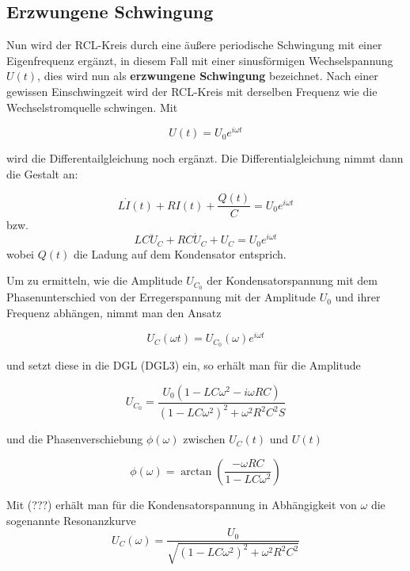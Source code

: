 \subsection{Erzwungene Schwingung}
Nun wird der RCL-Kreis durch eine äußere periodische Schwingung mit einer Eigenfrequenz ergänzt,
in diesem Fall mit einer sinusförmigen Wechselspannung $U(t)$, dies wird nun als \textbf{erzwungene Schwingung} bezeichnet.
Nach einer gewissen Einschwingzeit wird der RCL-Kreis mit derselben Frequenz wie die Wechselstromquelle schwingen.
Mit

\begin{equation*}
  U(t) = U_0 e^{i \omega t}
\end{equation*}

wird die Differentailgleichung noch ergänzt. Die Differentialgleichung nimmt dann die Gestalt an:

\begin{equation*}
  \label{DGL2}
  L \dot{I}(t) + R I(t) + \frac{Q(t)}{C} = U_0 e^{i \omega t}
\end{equation*}
 bzw.
 \begin{equation*}
   \label{DGL3}
   LC \ddot{U}_C + RC \dot{U}_C + U_C = U_0 e^{i \omega t}
 \end{equation*}
 wobei $Q(t)$ die Ladung auf dem Kondensator entsprich.

 Um zu ermitteln, wie die Amplitude $U_{C_0}$ der Kondensatorspannung mit dem Phasenunterschied von der Erregerspannung
 mit der Amplitude $U_0$ und ihrer Frequenz abhängen, nimmt man den Ansatz

 \begin{equation*}
   U_C(\omega t) = U_{C_0} (\omega) e^{i \omega t}
 \end{equation*}

 und setzt diese in die DGL (DGL3) ein, so erhält man für die Amplitude

 \begin{equation}
   \label{equation1}
   U_{C_0} = \frac{U_0 (1 - LC \omega^2 - i \omega RC)}{(1 - LC \omega^2)^2 + \omega^2 R^2 C^2 S}
 \end{equation}

 und die Phasenverschiebung $\phi (\omega)$ zwischen $U_C(t)$ und $U(t)$

 \begin{equation}
 \label{winkel}
   \phi(\omega) = \arctan \left(\frac{- \omega RC}{1 - LC \omega^2}\right)
 \end{equation}

Mit (???) erhält man für die Kondensatorspannung in Abhängigkeit von $\omega$ die sogenannte Resonanzkurve
\begin{equation}
  \label{omega}
  U_C(\omega) = \frac{U_0}{\sqrt{(1-LC \omega^2)^2 + \omega^2 R^2 C^2}}
\end{equation}

